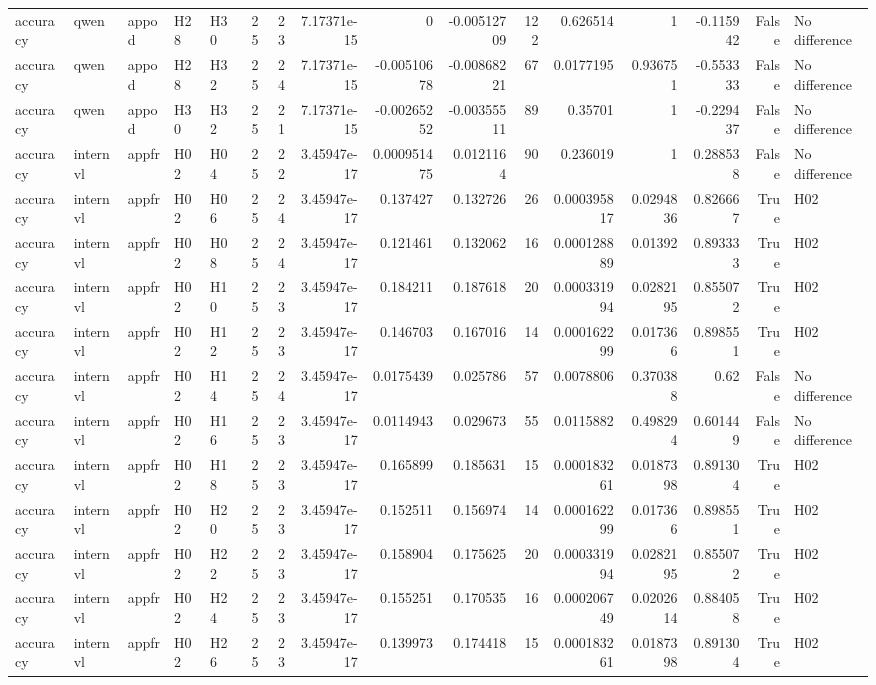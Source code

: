 \begin{longtable}{lllllrrrrrrrrrrl}
accuracy & qwen & appod & H28 & H30 & 25 & 23 & 7.17371e-15 & 0 & -0.00512709 & 122 & 0.626514 & 1 & -0.115942 & False & No difference \\
accuracy & qwen & appod & H28 & H32 & 25 & 24 & 7.17371e-15 & -0.00510678 & -0.00868221 & 67 & 0.0177195 & 0.936751 & -0.553333 & False & No difference \\
accuracy & qwen & appod & H30 & H32 & 25 & 21 & 7.17371e-15 & -0.00265252 & -0.00355511 & 89 & 0.35701 & 1 & -0.229437 & False & No difference \\
accuracy & internvl & appfr & H02 & H04 & 25 & 22 & 3.45947e-17 & 0.000951475 & 0.0121164 & 90 & 0.236019 & 1 & 0.288538 & False & No difference \\
accuracy & internvl & appfr & H02 & H06 & 25 & 24 & 3.45947e-17 & 0.137427 & 0.132726 & 26 & 0.000395817 & 0.0294836 & 0.826667 & True & H02 \\
accuracy & internvl & appfr & H02 & H08 & 25 & 24 & 3.45947e-17 & 0.121461 & 0.132062 & 16 & 0.000128889 & 0.01392 & 0.893333 & True & H02 \\
accuracy & internvl & appfr & H02 & H10 & 25 & 23 & 3.45947e-17 & 0.184211 & 0.187618 & 20 & 0.000331994 & 0.0282195 & 0.855072 & True & H02 \\
accuracy & internvl & appfr & H02 & H12 & 25 & 23 & 3.45947e-17 & 0.146703 & 0.167016 & 14 & 0.000162299 & 0.017366 & 0.898551 & True & H02 \\
accuracy & internvl & appfr & H02 & H14 & 25 & 24 & 3.45947e-17 & 0.0175439 & 0.025786 & 57 & 0.0078806 & 0.370388 & 0.62 & False & No difference \\
accuracy & internvl & appfr & H02 & H16 & 25 & 23 & 3.45947e-17 & 0.0114943 & 0.029673 & 55 & 0.0115882 & 0.498294 & 0.601449 & False & No difference \\
accuracy & internvl & appfr & H02 & H18 & 25 & 23 & 3.45947e-17 & 0.165899 & 0.185631 & 15 & 0.000183261 & 0.0187398 & 0.891304 & True & H02 \\
accuracy & internvl & appfr & H02 & H20 & 25 & 23 & 3.45947e-17 & 0.152511 & 0.156974 & 14 & 0.000162299 & 0.017366 & 0.898551 & True & H02 \\
accuracy & internvl & appfr & H02 & H22 & 25 & 23 & 3.45947e-17 & 0.158904 & 0.175625 & 20 & 0.000331994 & 0.0282195 & 0.855072 & True & H02 \\
accuracy & internvl & appfr & H02 & H24 & 25 & 23 & 3.45947e-17 & 0.155251 & 0.170535 & 16 & 0.000206749 & 0.0202614 & 0.884058 & True & H02 \\
accuracy & internvl & appfr & H02 & H26 & 25 & 23 & 3.45947e-17 & 0.139973 & 0.174418 & 15 & 0.000183261 & 0.0187398 & 0.891304 & True & H02 \\

\end{longtable}
